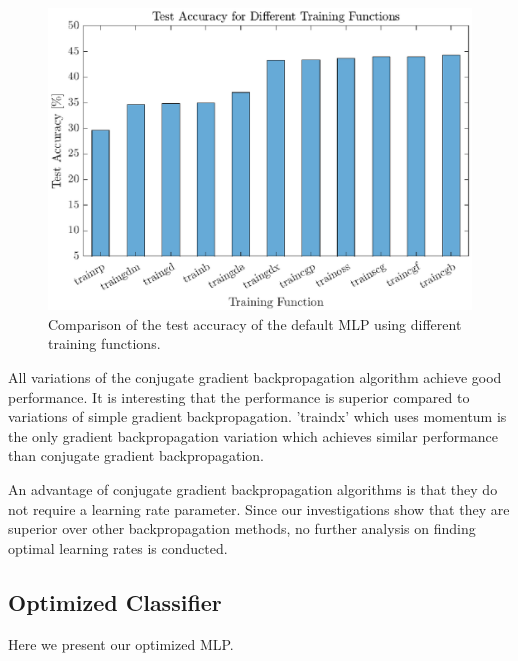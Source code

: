  \begin{figure}[h!]
 	\centering
 	\includegraphics{images/trainingFct}
 	\caption{Comparison of the test accuracy of the default MLP using different training functions.}
 	\label{fig:trainingFct}
 \end{figure}
 
 All variations of the conjugate gradient backpropagation algorithm\cite{moller1993scaled} achieve good performance. It is interesting that the performance is superior compared to variations of simple gradient backpropagation. 'traindx' which uses momentum is the only gradient backpropagation variation which achieves similar performance than conjugate gradient backpropagation.
 
 An advantage of conjugate gradient backpropagation algorithms is that they do not require a learning rate parameter. Since our investigations show that they are superior over other backpropagation methods, no further analysis on finding optimal learning rates is conducted.
 
\subsection{Optimized Classifier}

Here we present our optimized MLP.
